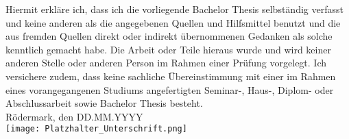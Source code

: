 Hiermit erkläre ich, dass ich die vorliegende Bachelor Thesis selbständig verfasst und keine anderen als die angegebenen Quellen und Hilfsmittel benutzt und die aus fremden Quellen direkt oder indirekt übernommenen Gedanken als solche kenntlich gemacht habe. Die Arbeit oder Teile hieraus wurde und wird keiner anderen Stelle oder anderen Person im Rahmen einer Prüfung vorgelegt. Ich versichere zudem, dass keine sachliche Übereinstimmung mit einer im Rahmen eines vorangegangenen Studiums angefertigten Seminar-, Haus-, Diplom- oder Abschlussarbeit sowie Bachelor Thesis besteht.
\\ [1.2em]
Rödermark, den DD.MM.YYYY%
\\ [1.2em]
\texttt{[image: Platzhalter\_Unterschrift.png]}
